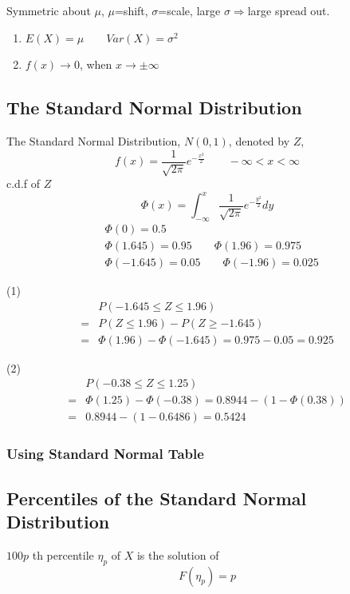 Symmetric about $\mu$, $\mu$=shift, $\sigma$=scale, large $\sigma\Rightarrow$large spread out.
 
\begin{prop}

\begin{enumerate}
\item $E(X)=\mu \qquad	Var(X)=\sigma^2$
\item $f(x) \to 0$, when $x \to \pm \infty$
\end{enumerate}
\end{prop}

\subsection{The Standard Normal Distribution}
The Standard Normal Distribution, $N(0,1)$, denoted by $Z$,
\[f(x)=\frac{1}{\sqrt{2 \pi}} e^{-\frac{x^2}{2}}  \qquad -\infty< x< \infty\]
c.d.f of $Z$
\[\Phi(x)=\int_{-\infty}^{x} \frac{1}{\sqrt{2 \pi}} e^{-\frac{y^2}{2}}  dy\]
\begin{align*}
&\Phi(0)=0.5 \\
&\Phi(1.645)=0.95 \qquad \Phi(1.96)=0.975 \\
&\Phi(-1.645)=0.05 \qquad \Phi(-1.96)=0.025
\end{align*}

\begin{exmp}
(1)
\begin{align*}
&P(-1.645 \leq Z \leq 1.96)\\
=&P(Z \leq 1.96)-P(Z \geq -1.645) \\
=&\Phi(1.96)-\Phi(-1.645)=0.975-0.05=0.925
\end{align*}

(2)
\begin{align*}
&P(-0.38 \leq Z \leq 1.25)\\
=&\Phi(1.25)-\Phi(-0.38)=0.8944-(1-\Phi(0.38))\\
=&0.8944-(1-0.6486)=0.5424
\end{align*}
\end{exmp}

\subsubsection{Using Standard Normal Table}

\subsection{Percentiles of the Standard Normal Distribution}
$100p$ th percentile $\eta_{p}$ of $X$ is the solution of 
\[F(\eta_p)=p\]

